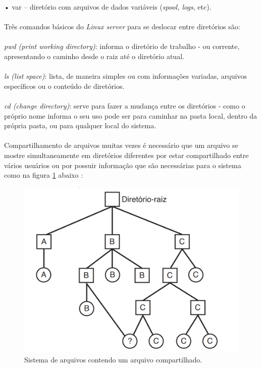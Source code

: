 •	var – diretório com arquivos de dados variáveis (\emph{spool, logs}, etc).\\
\\Três comandos básicos do \emph{Linux server} para se deslocar entre diretórios são:\\
\\\emph{pwd (print working directory)}: informa o diretório de trabalho - ou corrente, apresentando o caminho desde o raiz até o diretório atual.\\
\\\emph{ls (list space)}: lista, de maneira simples ou com informações variadas, arquivos específicos ou o conteúdo de diretórios.\\
\\\emph{cd (change directory)}: serve para fazer a mudança entre os diretórios - como o próprio nome informa o seu uso pode ser para caminhar na pasta local, dentro da própria pasta, ou para qualquer local do sistema.\\
\\Compartilhamento de arquivos muitas vezes é necessário que um arquivo se mostre simultaneamente em diretórios diferentes por estar compartilhado entre vários usuários ou por possuir informação que são necessárias para o sistema como na figura \ref{fig:DiretorioRaiz3} abaixo \cite{Tanenbaum2016}: 

\begin{figure}[htpb]
    \centering
   \includegraphics[scale=0.55]{imagens/DiretorioRaiz3.png}
   \caption{Sistema de arquivos contendo um arquivo
   compartilhado.  \cite{Tanenbaum2016}}
   \label{fig:DiretorioRaiz3}
\end{figure} 

